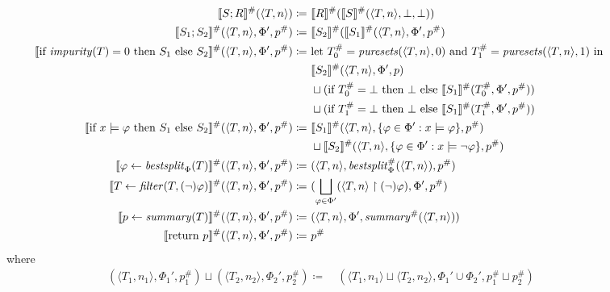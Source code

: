 \begin{figure}
\centering
\begin{align*}
\den{S ; R}^\#(\langle T, n \rangle) \coloneqq&~
\den{R}^\#(\den{S}^\#(\langle T, n \rangle, \bot, \bot)) \\
%
\den{S_1 ; S_2}^\#(\langle T, n \rangle, \Phi', p^\#) \coloneqq&~
\den{S_2}^\#(\den{S_1}^\#(\langle T, n \rangle, \Phi', p^\#) \\
%
\den{\text{if } \mathit{impurity}(T) = 0 \text{ then } S_1 \text{ else } S_2}^\#
(\langle T, n \rangle, \Phi', p^\#) \coloneqq&~
\text{let } T_0^\# = \mathit{puresets}(\langle T, n \rangle, 0) \text{ and }
T_1^\# = \mathit{puresets}(\langle T, n \rangle, 1) \text{ in } \\
&~\den{S_2}^\#(\langle T, n \rangle, \Phi', p) \\
&~\sqcup
(\text{if } T_0^\# = \bot \text{ then } \bot \text{ else } \den{S_1}^\#(T_0^\#, \Phi', p^\#)) \\
&~\sqcup
(\text{if } T_1^\# = \bot \text{ then } \bot \text{ else } \den{S_1}^\#(T_1^\#, \Phi', p^\#)) \\
%
\den{\text{if } x \models \varphi \text{ then } S_1 \text{ else } S_2}^\#
(\langle T, n \rangle, \Phi', p^\#) \coloneqq&~
\den{S_1}^\#(\langle T, n \rangle, \{\varphi \in \Phi' : x \models \varphi\}, p^\#) \\
&~\sqcup
\den{S_2}^\#(\langle T, n \rangle, \{\varphi \in \Phi' : x \models \lnot \varphi\}, p^\#) \\
%
\den{\varphi \gets \mathit{bestsplit}_\Phi(T)}^\#(\langle T, n \rangle, \Phi', p^\#)
\coloneqq&~ (\langle T, n \rangle, \mathit{bestsplit}_\Phi^\#(\langle T, n \rangle), p^\#) \\
%
\den{T \gets \mathit{filter}(T, (\lnot)\varphi)}^\#(\langle T, n \rangle, \Phi', p^\#)
\coloneqq&~ (\bigsqcup_{\varphi \in \Phi'} (\langle T, n \rangle \upharpoonright (\lnot) \varphi),
\Phi', p^\#) \\
%
\den{p \gets \mathit{summary}(T)}^\#(\langle T, n \rangle, \Phi', p^\#) \coloneqq&~
(\langle T, n \rangle, \Phi', \mathit{summary}^\#(\langle T, n \rangle)) \\
%
\den{\text{return } p}^\#(\langle T, n \rangle, \Phi', p^\#) \coloneqq&~ p^\#
\end{align*}
where
\begin{align*}
(\langle T_1, n_1 \rangle, \Phi_1', p_1^\#) \sqcup (\langle T_2, n_2 \rangle, \Phi_2', p_2^\#)
\coloneqq&~
(\langle T_1, n_1 \rangle \sqcup \langle T_2, n_2 \rangle,
\Phi_1' \cup \Phi_2', p_1^\# \sqcup p_2^\#) \\

\end{align*}
\end{figure}
